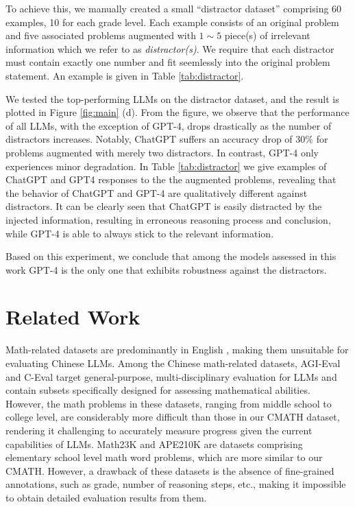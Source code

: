 To achieve this, we manually created a small ``distractor dataset'' comprising 60 examples, 10 for each grade level. Each example consists of an original problem and five associated problems augmented with $1\sim5$ piece(s) of irrelevant information which we refer to as \emph{distractor(s)}. We require that each distractor must contain exactly one number and fit seemlessly into the original problem statement. An example is given in Table \ref{tab:distractor}. 

We tested the top-performing LLMs on the distractor dataset, and the result is plotted in Figure \ref{fig:main} (d). From the figure, we observe that the performance of all LLMs, with the exception of GPT-4, drops drastically as the number of distractors increases. Notably, ChatGPT suffers an accuracy drop of 30\% for problems augmented with merely two distractors. In contrast, GPT-4 only experiences minor degradation.  In Table \ref{tab:distractor} we give examples of ChatGPT and GPT4 responses to the the augmented problems, revealing that the behavior of ChatGPT and GPT-4 are qualitatively different against distractors. It can be clearly seen that ChatGPT is easily distracted by the injected information, resulting in erroneous reasoning process and conclusion, while GPT-4 is able to always stick to the relevant information.

Based on this experiment, we conclude that among the models assessed in this work GPT-4 is the only one that exhibits robustness against the distractors. 

\section{Related Work} Math-related datasets are predominantly in English \citep{math, mathqa, gsm8k, mmlu}, making them unsuitable for evaluating Chinese LLMs. Among the Chinese math-related datasets, AGI-Eval \citep{agieval} and C-Eval \citep{ceval} target general-purpose, multi-disciplinary evaluation for LLMs and contain subsets specifically designed for assessing mathematical abilities. However, the math problems in these datasets, ranging from middle school to college level, are considerably more difficult than those in our CMATH dataset, rendering it challenging to accurately measure progress given the current capabilities of LLMs. Math23K \citep{math23k} and APE210K \citep{ape210k} are datasets comprising elementary school level math word problems, which are more similar to our CMATH. However, a drawback of these datasets is the absence of fine-grained annotations, such as grade, number of reasoning steps, etc., making it impossible to obtain detailed evaluation results from them.

